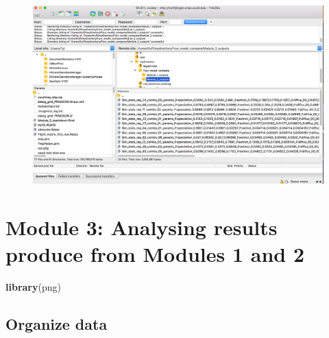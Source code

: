\documentclass[]{book}
\newenvironment{Shaded}{\begin{snugshade}}{\end{snugshade}}
\newcommand{\KeywordTok}[1]{\textcolor[rgb]{0.13,0.29,0.53}{\textbf{{#1}}}}
\newcommand{\NormalTok}[1]{{#1}}
\theoremstyle{definition}
\theoremstyle{definition}
\theoremstyle{definition}
\theoremstyle{remark}
\begin{document}
\begin{figure}
\centering
\includegraphics{Files from module 2.png}
\caption{}
\end{figure}

\chapter{Module 3: Analysing results produce from Modules 1 and
2}\label{module-3-analysing-results-produce-from-modules-1-and-2}

\begin{Shaded}
\begin{Highlighting}[]
\KeywordTok{library}\NormalTok{(png)}
\end{Highlighting}
\end{Shaded}

\section{Organize data}\label{organize-data}
\end{document}
